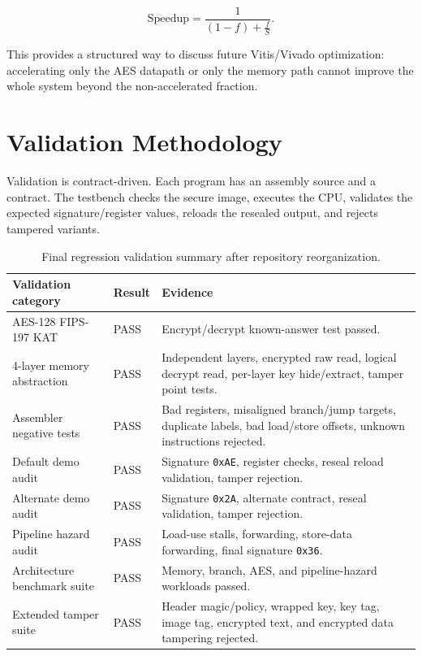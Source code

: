 \documentclass[conference]{IEEEtran}
\begin{document}
\begin{equation}
\text{Speedup}=\frac{1}{(1-f)+\frac{f}{S}}.
\end{equation}

This provides a structured way to discuss future Vitis/Vivado optimization: accelerating only the AES datapath or only the memory path cannot improve the whole system beyond the non-accelerated fraction.

\section{Validation Methodology}

Validation is contract-driven. Each program has an assembly source and a contract. The testbench checks the secure image, executes the CPU, validates the expected signature/register values, reloads the resealed output, and rejects tampered variants.

\begin{table}[!t]
\caption{Final regression validation summary after repository reorganization.}
\label{tab:validation}
\centering
\scriptsize
\begin{tabularx}{\textwidth}{@{}L{0.26\textwidth}L{0.15\textwidth}Y@{}}
\toprule
Validation category & Result & Evidence \\
\midrule
AES-128 FIPS-197 KAT & PASS & Encrypt/decrypt known-answer test passed. \\
4-layer memory abstraction & PASS & Independent layers, encrypted raw read, logical decrypt read, per-layer key hide/extract, tamper point tests. \\
Assembler negative tests & PASS & Bad registers, misaligned branch/jump targets, duplicate labels, bad load/store offsets, unknown instructions rejected. \\
Default demo audit & PASS & Signature \texttt{0xAE}, register checks, reseal reload validation, tamper rejection. \\
Alternate demo audit & PASS & Signature \texttt{0x2A}, alternate contract, reseal validation, tamper rejection. \\
Pipeline hazard audit & PASS & Load-use stalls, forwarding, store-data forwarding, final signature \texttt{0x36}. \\
Architecture benchmark suite & PASS & Memory, branch, AES, and pipeline-hazard workloads passed. \\
Extended tamper suite & PASS & Header magic/policy, wrapped key, key tag, image tag, encrypted text, and encrypted data tampering rejected. \\
\bottomrule
\end{tabularx}
\end{table}
\end{document}
